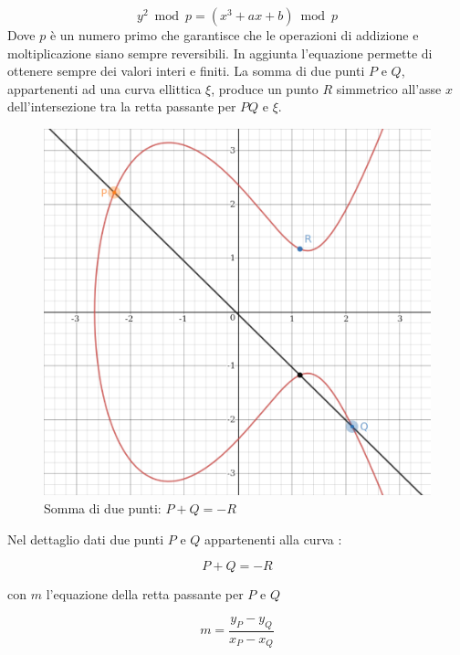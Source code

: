 \begin{equation}
    y^2 \bmod p = (x^3 + ax + b) \bmod p
\end{equation}
Dove $p$ è un numero primo che garantisce che le operazioni di addizione e moltiplicazione siano sempre reversibili. In aggiunta l'equazione permette di ottenere sempre dei valori interi e finiti.\newline\newline
La somma di due punti $P$ e $Q$, appartenenti ad una curva ellittica $\xi$, produce un punto $R$ simmetrico all'asse $x$ dell'intersezione tra la retta passante per $PQ$ e $\xi$.

\begin{figure}[H]
    \centering
    \includegraphics{images/ECDSA.png}
    \caption{Somma di due punti: $P+Q=-R$}
    \label{fig:ECDSA}
\end{figure}

Nel dettaglio dati due punti $P$ e $Q$ appartenenti alla curva \xi:

\begin{equation}
    P + Q = -R
\end{equation}

con $m$ l'equazione della retta passante per $P$ e $Q$

\begin{equation}
    m=\frac{y_P-y_Q}{x_P-x_Q}
\end{equation}

